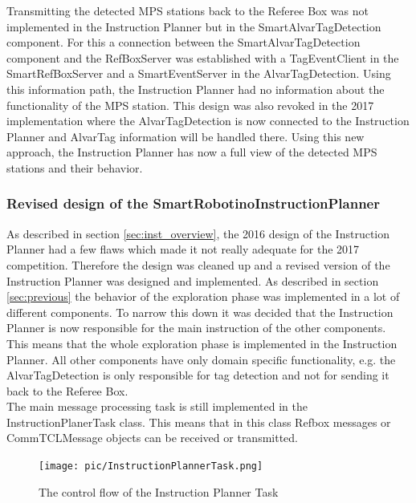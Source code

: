 Transmitting the detected MPS stations back to the Referee Box was not implemented in the Instruction Planner but in the SmartAlvarTagDetection component. For this a connection between the SmartAlvarTagDetection component and the RefBoxServer was established with a TagEventClient in the SmartRefBoxServer and a SmartEventServer in the AlvarTagDetection. Using this information path, the Instruction Planner had no information about the functionality of the MPS station. This design was also revoked in the 2017 implementation where the AlvarTagDetection is now connected to the Instruction Planner and AlvarTag information will be handled there. Using this new approach, the Instruction Planner has now a full view of the detected MPS stations and their behavior. 
  

\subsubsection{Revised design of the SmartRobotinoInstructionPlanner}
\label{sec:new_design}

As described in section \ref{sec:inst_overview}, the 2016 design of the Instruction Planner had a few flaws which made it not really adequate for the 2017 competition. Therefore the design was cleaned up and a revised version of the Instruction Planner was designed and implemented. As described in section \ref{sec:previous} the behavior of the exploration phase was implemented in a lot of different components. To narrow this down it was decided that the Instruction Planner is now responsible for the main instruction of the other components. This means that the whole exploration phase is implemented in the Instruction Planner. All other components have only domain specific functionality, e.g. the AlvarTagDetection is only responsible for tag detection and not for sending it back to the Referee Box. \\

The main message processing task is still implemented in the InstructionPlanerTask class. This means that in this class Refbox messages or CommTCLMessage objects can be received or transmitted. \\


\begin{figure}[h]
\centering
\texttt{[image: pic/InstructionPlannerTask.png]}
\caption{The control flow of the Instruction Planner Task}
\label{fig:instructionplannertask}
\end{figure}
 
